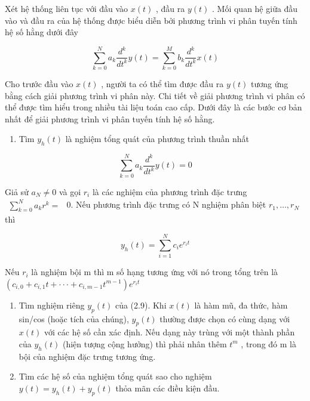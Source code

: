 \documentclass[
  10
]{article}
\providecommand{\tightlist}{%
  \setlength{\itemsep}{0pt}\setlength{\parskip}{0pt}}
\begin{document}
Xét hệ thống liên tục với đầu vào \(x ( t )\) , đầu ra \(y ( t )\) . Mối
quan hệ giữa đầu vào và đầu ra của hệ thống được biểu diễn bởi phương
trình vi phân tuyến tính hệ số hằng dưới đây

\[
\sum_ {k = 0} ^ {N} a _ {k} \frac {d ^ {k}}{d t ^ {k}} y (t) = \sum_ {k = 0} ^ {M} b _ {k} \frac {d ^ {k}}{d t ^ {k}} x (t)\tag{2.9}
\]

Cho trước đầu vào \(x ( t )\) , người ta có thể tìm được đầu ra
\(y ( t )\) tương ứng bằng cách giải phương trình vi phân này. Chi tiết
về giải phương trình vi phân có thể được tìm hiểu trong nhiều tài liệu
toán cao cấp. Dưới đây là các bước cơ bản nhất để giải phương trình vi
phân tuyến tính hệ số hằng.

\begin{enumerate}
\def\labelenumi{(\arabic{enumi})}
\tightlist
\item
  Tìm \(y _ { h } ( t )\) là nghiệm tổng quát của phương trình thuần
  nhất
\end{enumerate}

\[
\sum_ {k = 0} ^ {N} a _ {k} \frac {d ^ {k}}{d t ^ {k}} y (t) = 0
\]

Giả sử \(a _ { N } \neq 0\) và gọi \(r _ { i }\) là các nghiệm của
phương trình đặc trưng
\(\begin{array} { r } { \sum _ { k = 0 } ^ { N } a _ { k } r ^ { k } = } \end{array}\)
0. Nếu phương trình đặc trưng có N nghiệm phân biệt
\(r _ { 1 } , \ldots , r _ { N }\) thì

\[
y _ {h} (t) = \sum_ {i = 1} ^ {N} c _ {i} e ^ {r _ {i} t}
\]

Nếu \(r _ { i }\) là nghiệm bội m thì m số hạng tương ứng với nó trong
tổng trên là
\(\left( c _ { i , 0 } + c _ { i , 1 } t + \cdot \cdot \cdot + c _ { i , m - 1 } t ^ { m - 1 } \right) e ^ { r _ { i } t }\)

\begin{enumerate}
\def\labelenumi{(\arabic{enumi})}
\setcounter{enumi}{1}
\item
  Tìm nghiệm riêng \(y _ { p } ( t )\) của (2.9). Khi \(x ( t )\) là hàm
  mũ, đa thức, hàm sin/cos (hoặc tích của chúng), \(y _ { p } ( t )\)
  thường được chọn có cùng dạng với \(x ( t )\) với các hệ số cần xác
  định. Nếu dạng này trùng với một thành phần của \(y _ { h } ( t )\)
  (hiện tượng cộng hưởng) thì phải nhân thêm \(t ^ { m }\) , trong đó m
  là bội của nghiệm đặc trưng tương ứng.
\item
  Tìm các hệ số của nghiệm tổng quát sao cho nghiệm
  \(y ( t ) = y _ { h } ( t ) + y _ { p } ( t )\) thỏa mãn các điều kiện
  đầu.
\end{enumerate}
\end{document}
